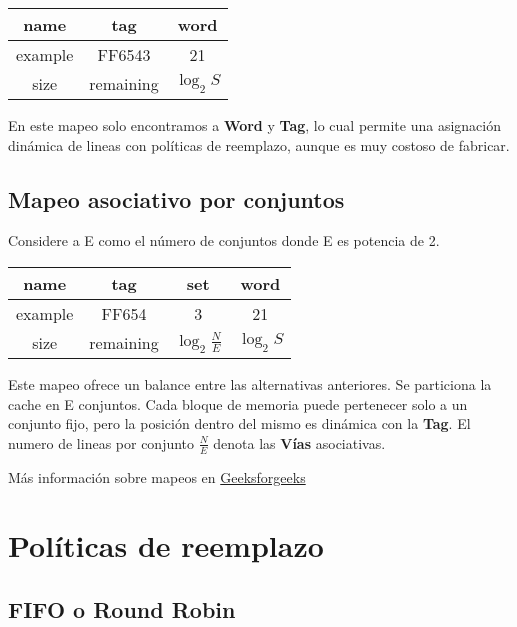 \documentclass{article}
\begin{document}
\begin{multicols}{2}
		\begin{center}
			\begin{tabular}{|c|c|c|}
				\hline
				name & tag & word \\
				\hline
				example & FF6543 & 21 \\
				\hline
				size & remaining & $\log_2S$ \\
				\hline
			\end{tabular}
		\end{center}
		
		En este mapeo solo encontramos a \textbf{Word} y \textbf{Tag}, lo cual permite una asignación dinámica de lineas con políticas de reemplazo, aunque es muy costoso de fabricar.
		
		\subsection{Mapeo asociativo por conjuntos}
		
		Considere a E como el número de conjuntos donde E es potencia de 2.
		
		\begin{center}
			\begin{tabular}{|c|c|c|c|}
				\hline
				name & tag & set & word \\
				\hline
				example & FF654 & 3 & 21 \\
				\hline
				size & remaining & $\log_2\frac{N}{E}$ & $\log_2S$ \\
				\hline
			\end{tabular}
		\end{center}
		
		Este mapeo ofrece un balance entre las alternativas anteriores. Se particiona la cache en E conjuntos. Cada bloque de memoria puede pertenecer solo a un conjunto fijo, pero la posición dentro del mismo es dinámica con la \textbf{Tag}. El numero de lineas por conjunto $\frac{N}{E}$ denota las \textbf{Vías} asociativas.
		
		{\footnotesize Más información sobre mapeos en \href{https://www.geeksforgeeks.org/computer-organization-architecture/difference-between-direct-mapping-associative-mapping-set-associative-mapping/}{Geeksforgeeks}}
		
		\section{Políticas de reemplazo}
		
		\subsection{FIFO o Round Robin}
		

\end{multicols}
\end{document}

